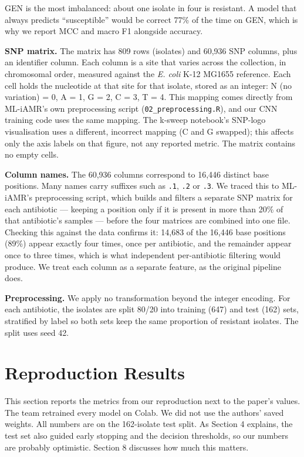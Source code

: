 \documentclass[11pt]{article}
\begin{document}
GEN is the most imbalanced: about one isolate in four is resistant. A model that always predicts ``susceptible'' would be correct 77\% of the time on GEN, which is why we report MCC and macro F1 alongside accuracy.

\textbf{SNP matrix.} The matrix has 809 rows (isolates) and 60,936 SNP columns, plus an identifier column. Each column is a site that varies across the collection, in chromosomal order, measured against the \textit{E. coli} K-12 MG1655 reference. Each cell holds the nucleotide at that site for that isolate, stored as an integer: N (no variation) = 0, A = 1, G = 2, C = 3, T = 4. This mapping comes directly from ML-iAMR's own preprocessing script (\texttt{02\_preprocessing.R}), and our CNN training code uses the same mapping. The k-sweep notebook's SNP-logo visualisation uses a different, incorrect mapping (C and G swapped); this affects only the axis labels on that figure, not any reported metric. The matrix contains no empty cells.

\textbf{Column names.} The 60,936 columns correspond to 16,446 distinct base positions. Many names carry suffixes such as \texttt{.1}, \texttt{.2} or \texttt{.3}. We traced this to ML-iAMR's preprocessing script, which builds and filters a separate SNP matrix for each antibiotic --- keeping a position only if it is present in more than 20\% of that antibiotic's samples --- before the four matrices are combined into one file. Checking this against the data confirms it: 14,683 of the 16,446 base positions (89\%) appear exactly four times, once per antibiotic, and the remainder appear once to three times, which is what independent per-antibiotic filtering would produce. We treat each column as a separate feature, as the original pipeline does.

\textbf{Preprocessing.} We apply no transformation beyond the integer encoding. For each antibiotic, the isolates are split 80/20 into training (647) and test (162) sets, stratified by label so both sets keep the same proportion of resistant isolates. The split uses seed 42.

\section{Reproduction Results}

This section reports the metrics from our reproduction next to the paper's values. The team retrained every model on Colab. We did not use the authors' saved weights. All numbers are on the 162-isolate test split. As Section 4 explains, the test set also guided early stopping and the decision thresholds, so our numbers are probably optimistic. Section 8 discusses how much this matters.
\end{document}
